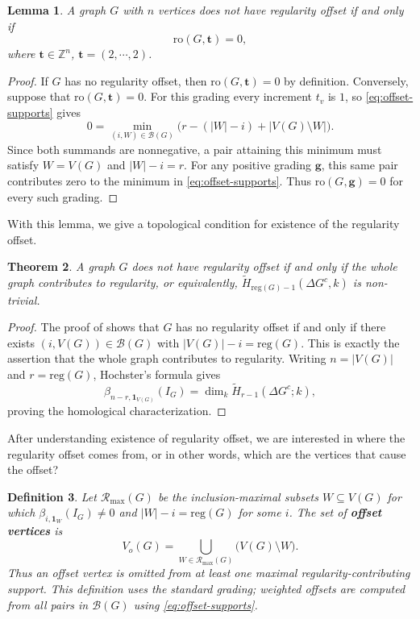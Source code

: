 \documentclass[dvipsnames,10pt]{article}
\newtheorem{theorem}{Theorem}[section]
\newtheorem{lemma}[theorem]{Lemma}
\newtheorem{defi}[theorem]{Definition}
\begin{document}
\begin{lemma}
    A graph $G$ with $n$ vertices does not have regularity offset if and only if
    \begin{equation*}
        \mathrm{ro}(G,\mathbf{t})=0,
    \end{equation*}
    where $\mathbf{t}\in\mathbb{Z}^n$, $\mathbf{t}=(2,\cdots,2)$.
\end{lemma}

\begin{proof}
    If $G$ has no regularity offset, then $\mathrm{ro}(G,\mathbf{t})=0$ by definition. Conversely, suppose that $\mathrm{ro}(G,\mathbf{t})=0$. For this grading every increment $t_v$ is $1$, so \eqref{eq:offset-supports} gives
    \[
        0=\min_{(i,W)\in\mathcal{B}(G)}
          \bigl(r-(|W|-i)+|V(G)\setminus W|\bigr).
    \]
    Since both summands are nonnegative, a pair attaining this minimum must satisfy $W=V(G)$ and $|W|-i=r$. For any positive grading $\mathbf{g}$, this same pair contributes zero to the minimum in \eqref{eq:offset-supports}. Thus $\mathrm{ro}(G,\mathbf{g})=0$ for every such grading.
\end{proof}

With this lemma, we give a topological condition for existence of the regularity offset.

\begin{theorem}
    A graph $G$ does not have regularity offset if and only if the whole graph contributes to regularity, or equivalently, $\widetilde{H}_{\mathrm{reg}(G)-1}\left(\Delta G^c, k\right)$ is non-trivial.
\end{theorem}

\begin{proof}
    The proof of  shows that $G$ has no regularity offset if and only if there exists $(i,V(G))\in\mathcal{B}(G)$ with $|V(G)|-i=\mathrm{reg}(G)$. This is exactly the assertion that the whole graph contributes to regularity. Writing $n=|V(G)|$ and $r=\mathrm{reg}(G)$, Hochster's formula gives
    \[
        \beta_{n-r,\mathbf{1}_{V(G)}}(I_G)
        =\dim_k\widetilde{H}_{r-1}(\Delta G^c;k),
    \]
    proving the homological characterization.
\end{proof}

After understanding existence of regularity offset, we are interested in where the regularity offset comes from, or in other words, which are the vertices that cause the offset?

\begin{defi}
    Let $\mathcal{R}_{\max}(G)$ be the inclusion-maximal subsets $W\subseteq V(G)$ for which $\beta_{i,\mathbf{1}_W}(I_G)\neq0$ and $|W|-i=\mathrm{reg}(G)$ for some $i$. The set of \textbf{offset vertices} is
    \[
        V_o(G)=\bigcup_{W\in\mathcal{R}_{\max}(G)}\bigl(V(G)\setminus W\bigr).
    \]
    Thus an offset vertex is omitted from at least one maximal regularity-contributing support. This definition uses the standard grading; weighted offsets are computed from all pairs in $\mathcal{B}(G)$ using \eqref{eq:offset-supports}.
\end{defi}
\end{document}
